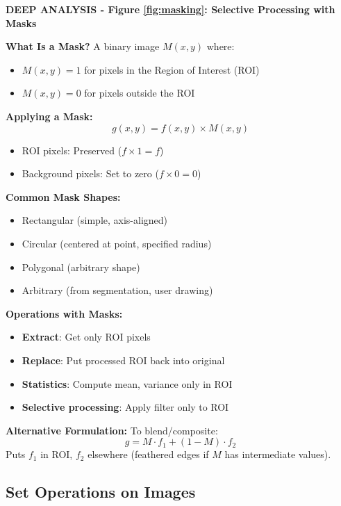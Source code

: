 \documentclass[12pt,a4paper]{article}
\begin{document}
\begin{deepexplanation}
\textbf{DEEP ANALYSIS - Figure \ref{fig:masking}: Selective Processing with Masks}

\textbf{What Is a Mask?}
A binary image $M(x, y)$ where:
\begin{itemize}
    \item $M(x, y) = 1$ for pixels in the Region of Interest (ROI)
    \item $M(x, y) = 0$ for pixels outside the ROI
\end{itemize}

\textbf{Applying a Mask:}
\[
g(x, y) = f(x, y) \times M(x, y)
\]
\begin{itemize}
    \item ROI pixels: Preserved ($f \times 1 = f$)
    \item Background pixels: Set to zero ($f \times 0 = 0$)
\end{itemize}

\textbf{Common Mask Shapes:}
\begin{itemize}
    \item Rectangular (simple, axis-aligned)
    \item Circular (centered at point, specified radius)
    \item Polygonal (arbitrary shape)
    \item Arbitrary (from segmentation, user drawing)
\end{itemize}

\textbf{Operations with Masks:}
\begin{itemize}
    \item \textbf{Extract}: Get only ROI pixels
    \item \textbf{Replace}: Put processed ROI back into original
    \item \textbf{Statistics}: Compute mean, variance only in ROI
    \item \textbf{Selective processing}: Apply filter only to ROI
\end{itemize}

\textbf{Alternative Formulation:}
To blend/composite:
\[
g = M \cdot f_1 + (1 - M) \cdot f_2
\]
Puts $f_1$ in ROI, $f_2$ elsewhere (feathered edges if $M$ has intermediate values).
\end{deepexplanation}


\subsection{Set Operations on Images}
\end{document}
